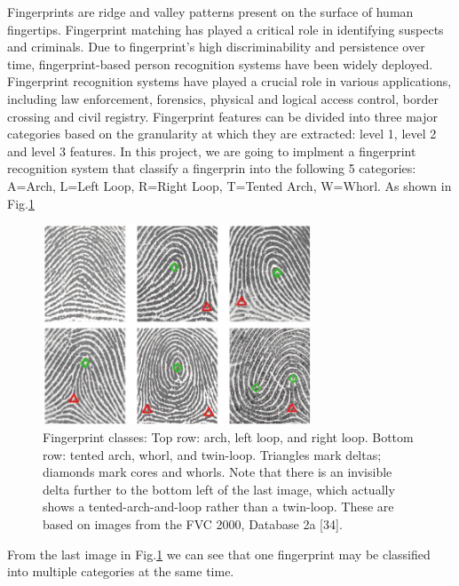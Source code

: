 

Fingerprints are ridge and valley patterns present on the surface of human fingertips.
%
Fingerprint matching has played a critical role in identifying suspects and criminals.
%
Due to fingerprint’s high discriminability and persistence over time, fingerprint-based person recognition systems have been widely deployed.
%
Fingerprint recognition systems have played a crucial role in various applications, including law enforcement, forensics, physical and logical access control, border crossing and civil registry.
%
Fingerprint features can be divided into three major categories based on the granularity at which they are extracted: level 1, level 2 and level 3 features.
%
In this project, we are going to implment a fingerprint recognition system that classify a fingerprin into the following 5 categories:
%
A=Arch, L=Left Loop, R=Right Loop, T=Tented Arch, W=Whorl.
%
As shown in Fig.\ref{fig.fingerprint_classes}

\begin{figure}[!ht]
	\begin{center}
		\includegraphics[width=8cm]{fig/Fingerprint_classes.png}
	\end{center}
	\caption{Fingerprint classes: Top row: arch, left loop, and right loop. Bottom row: tented arch, whorl, and twin-loop. Triangles mark deltas; diamonds mark cores and whorls. Note that there is an invisible delta further to the bottom left of the last image, which actually shows a tented-arch-and-loop rather than a twin-loop. These are based on images from the FVC 2000, Database 2a [34]. }
	\label{fig.fingerprint_classes}
\end{figure}

From the last image in Fig.\ref{fig.fingerprint_classes} we can see that one fingerprint may be classified into multiple categories at the same time.